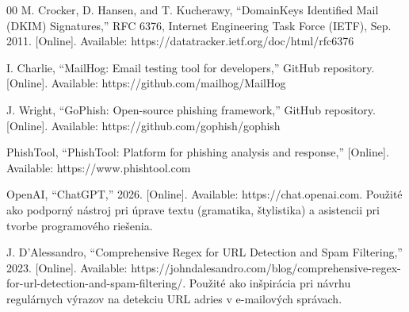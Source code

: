 \documentclass[conference]{IEEEtran}
\begin{document}
\begin{thebibliography}{00}
M. Crocker, D. Hansen, and T. Kucherawy, ``DomainKeys Identified Mail (DKIM) Signatures,'' RFC 6376, Internet Engineering Task Force (IETF), Sep. 2011. [Online]. Available: https://datatracker.ietf.org/doc/html/rfc6376

I. Charlie, ``MailHog: Email testing tool for developers,'' GitHub repository. [Online]. Available: https://github.com/mailhog/MailHog

J. Wright, ``GoPhish: Open-source phishing framework,'' GitHub repository. [Online]. Available: https://github.com/gophish/gophish

PhishTool, ``PhishTool: Platform for phishing analysis and response,'' [Online]. Available: https://www.phishtool.com

OpenAI, ``ChatGPT,'' 2026. [Online]. Available: https://chat.openai.com. 
Použité ako podporný nástroj pri úprave textu (gramatika, štylistika) a asistencii pri tvorbe programového riešenia.

J. D'Alessandro, ``Comprehensive Regex for URL Detection and Spam Filtering,'' 2023. [Online]. Available: https://johndalesandro.com/blog/comprehensive-regex-for-url-detection-and-spam-filtering/. 
Použité ako inšpirácia pri návrhu regulárnych výrazov na detekciu URL adries v e-mailových správach.
\end{thebibliography}

\vspace{12pt}
\end{document}
